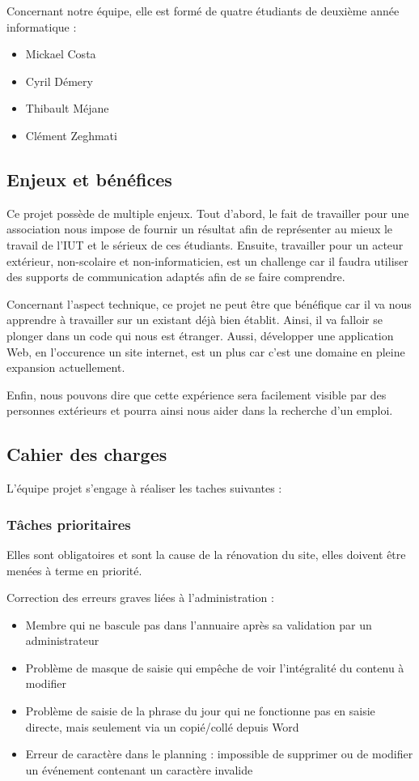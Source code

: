 \documentclass[11pt]{report}
\begin{document}
\par Concernant notre équipe, elle est formé de quatre étudiants de deuxième 
année informatique : 
\begin{itemize}
    \item Mickael Costa
    \item Cyril Démery
    \item Thibault Méjane
    \item Clément Zeghmati
\end{itemize}


\subsection{Enjeux et bénéfices}
Ce projet possède de multiple enjeux. Tout d'abord, le fait de travailler pour 
une association nous impose de fournir un résultat afin de représenter au mieux 
le travail de l'IUT et le sérieux de ces étudiants. Ensuite, travailler pour 
un acteur extérieur, non-scolaire et non-informaticien, est un challenge car il 
faudra utiliser des supports de communication adaptés afin de se faire 
comprendre. \\

\par Concernant l'aspect technique, ce projet ne peut être que bénéfique car il 
va nous apprendre à travailler sur un existant déjà bien établit. Ainsi, il va 
falloir se plonger dans un code qui nous est étranger. Aussi, développer une 
application Web, en l'occurence un site internet, est un plus car c'est une 
domaine en pleine expansion actuellement.\\

\par Enfin, nous pouvons dire que cette expérience sera facilement visible par 
des personnes extérieurs et pourra ainsi nous aider dans la recherche d'un 
emploi.
\subsection{Cahier des charges}
L'équipe projet s'engage à réaliser les taches suivantes :
\subsubsection*{Tâches prioritaires}
Elles sont obligatoires et sont la cause de la rénovation du site, elles doivent être menées à terme en priorité. 

Correction des erreurs graves liées à l'administration :
\begin{itemize}
\item Membre qui ne bascule pas dans l'annuaire après sa validation par un
administrateur
\item Problème de masque de saisie qui empêche de voir l'intégralité du contenu
à modifier 
\item Problème de saisie de la phrase du jour qui ne fonctionne pas en saisie
directe, mais seulement via un copié/collé depuis Word
\item Erreur de caractère dans le planning : impossible de supprimer ou de
modifier un événement contenant un caractère invalide
\end{itemize}
\end{document}
